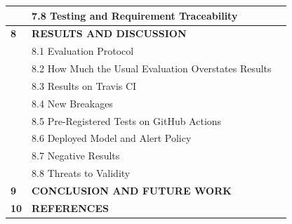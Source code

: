{\begin{longtable}{|>{\centering\arraybackslash}p{1.1cm}|p{11.6cm}|>{\centering\arraybackslash}p{1.4cm}|}
 & 7.8 Testing and Requirement Traceability & \pageref{sec:testing}\\ \hline
\textbf{8} & \textbf{RESULTS AND DISCUSSION} & \textbf{\pageref{ch:results}}\\ \hline
 & 8.1 Evaluation Protocol & \pageref{sec:protocol}\\ \hline
 & 8.2 How Much the Usual Evaluation Overstates Results & \pageref{sec:leakage}\\ \hline
 & 8.3 Results on Travis CI & \pageref{sec:travis}\\ \hline
 & 8.4 New Breakages & \pageref{sec:newbreak}\\ \hline
 & 8.5 Pre-Registered Tests on GitHub Actions & \pageref{sec:gha}\\ \hline
 & 8.6 Deployed Model and Alert Policy & \pageref{sec:alerts}\\ \hline
 & 8.7 Negative Results & \pageref{sec:negative}\\ \hline
 & 8.8 Threats to Validity & \pageref{sec:threats}\\ \hline
\textbf{9} & \textbf{CONCLUSION AND FUTURE WORK} & \textbf{\pageref{ch:conclusion}}\\ \hline
\textbf{10} & \textbf{REFERENCES} & \textbf{\pageref{ch:references}}\\ \hline
\end{longtable}}
\clearpage

